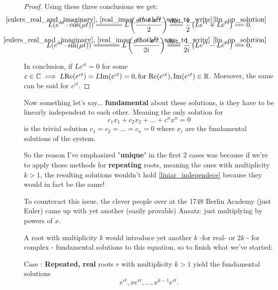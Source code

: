 \begin{proof}
	\newcommand\byDistributivity{\stackrel{\mathclap{\normalfont\mbox{dist.}}}{=\joinrel=\joinrel=}}

	\newcommand\operatorSatisfy{\stackrel{\mathclap{\normalfont\mbox{\ref{lin_op_solution}}}}{=\joinrel=}}

	Using these three conclusions we get:
	\begin{align*}
		L(e^{\lambda t} \cdot \text{cos}(\mu t)) \firstConclusion
		L\left(\frac{e^{rt}+e^{\overline{r}t}}{2} \right) \byDistributivity
		\frac{1}{2} \left( Le^{rt} + Le^{\overline{r}t} \right) \operatorSatisfy 0 , \\
		L(e^{\lambda t} \cdot \text{sin}(\mu t)) \firstConclusion
		L\left(\frac{e^{rt}-e^{\overline{r}t}}{2i} \right) \byDistributivity
		\frac{1}{2i} \left( Le^{rt} - Le^{\overline{r}t} \right) \operatorSatisfy 0 ,
	\end{align*}

	In conclusion, if $Le^{ct}=0$ for some $c \in \mathbb{C} \implies L\text{Re}(e^{ ct })= L\text{Im}(e^{ct})=0, \\
	\text{for } \text{Re}(e^{ct}), \text{Im}(e^{ct}) \in \mathbb{R}$.
	Moreover, the same can be said for $e^{\overline{c}t}$.
\end{proof}

Now something let's say... \textbf{fundamental} about these solutions, is they have to be linearly independent to each other. Meaning the only solution for
\begin{equation}\label{liniar_independece}
	c_1 x_1+c_2 x_2 + \dots + c^n x^n = 0
\end{equation}
is the trivial solution $c_1=c_2=\dots=c_n=0$ where $x_i$ are the fundamental solutions of the system.

So the reason I've emphasized "\textbf{unique}" in the first 2 cases was because if we're to apply those methods for \textbf{repeating} roots, meaning the ones with multiplicity $k>1$, the resulting solutions wouldn't hold \ref{liniar_independece} because they would in fact be the same!

To counteract this issue, the clever people over at the 1748 Berlin Academy (just Euler) came up with yet another (easily provable) Ansatz: just multiplying by powers of $x$.

A root with multiplicity $k$ would introduce yet another $k$ -for real- or $2k$ - for complex - fundamental solutions to this equation, so to finish what we've started:

Case : \textbf{Repeated, real} roots $r$ with multiplicity $k>1$ yield the fundamental solutions
\[
	e^{rt}, xe^{rt}, \dots,x^{k-1}e^{rt}.
\]

